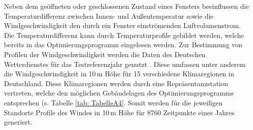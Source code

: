 Neben dem geöffneten oder geschlossenen Zustand eines Fensters beeinflussen die Temperaturdifferenz zwischen Innen- und Außentemperatur sowie die Windgeschwindigkeit den durch ein Fenster einströmenden Luftvolumenstrom.
Die Temperaturdifferenz kann durch Temperaturprofile gebildet werden, welche bereits in das Optimierungsprogramm eingelesen werden.
Zur Bestimmung von Profilen der Windgeschwindigkeit werden die Daten des Deutschen Wetterdienstes für das Testreferenzjahr genutzt \cite{try}.
Diese umfassen unter anderem die Windgeschwindigkeit in 10\,m Höhe für 15 verschiedene Klimaregionen in Deutschland.
Diese Klimaregionen werden durch eine Repräsentanzstation vertreten, welche den möglichen Gebäudelagen des Optimierungsprogramms entsprechen (s. Tabelle \ref{tab: TabelleA4}.
Somit werden für die jeweiligen Standorte Profile des Windes in 10\,m Höhe für 8760 Zeitpunkte eines Jahres generiert.









